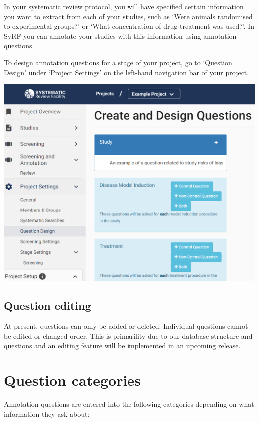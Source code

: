\documentclass[
]{book}
\begin{document}
In your systematic review protocol, you will have specified certain information you want to extract from each of your studies, such as `Were animals randomised to experimental groups?' or `What concentration of drug treatment was used?'. In SyRF you can annotate your studies with this information using annotation questions.

To design annotation questions for a stage of your project, go to `Question Design' under `Project Settings' on the left-hand navigation bar of your project.

\includegraphics[width=19.11in]{figs/Fig_Question_design}

\hypertarget{question-editing}{%
\subsection{Question editing}\label{question-editing}}

At present, questions can only be added or deleted. Individual questions cannot be edited or changed order. This is primarility due to our database structure and questions and an editing feature will be implemented in an upcoming release.

\hypertarget{question-categories}{%
\section{Question categories}\label{question-categories}}

Annotation questions are entered into the following categories depending on what information they ask about:
\end{document}
